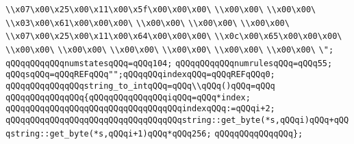 \verb|\\x07\x00\x25\x00\x11\x00\x5f\x00\x00\x00\|\newline
\verb|\\x00\x00\|\newline
\verb|\\x00\x00\|\newline
\verb|\\x03\x00\x61\x00\x00\x00\|\newline
\verb|\\x00\x00\|\newline
\verb|\\x00\x00\|\newline
\verb|\\x00\x00\|\newline
\verb|\\x07\x00\x25\x00\x11\x00\x64\x00\x00\x00\|\newline
\verb|\\x0c\x00\x65\x00\x00\x00\|\newline
\verb|\\x00\x00\|\newline
\verb|\\x00\x00\|\newline
\verb|\\x00\x00\|\newline
\verb|\\x00\x00\|\newline
\verb|\\x00\x00\|\newline
\verb|\\x00\x00\|\newline
\verb|\";|\newline
\verb|qQQqqQQqqQQqnumstatesqQQq=qQQq104;|\newline
\verb|qQQqqQQqqQQqnumrulesqQQq=qQQq55;|\newline
\verb|qQQqsqQQq=qQQqREFqQQq"";qQQqqQQqindexqQQq=qQQqREFqQQq0;|\newline
\verb|qQQqqQQqqQQqqQQqstring_to_intqQQq=qQQq\\qQQq()qQQq=qQQq|\newline
\verb|qQQqqQQqqQQqqQQq{qQQqqQQqqQQqqQQqiqQQq=qQQq*index;|\newline
\verb|qQQqqQQqqQQqqQQqqQQqqQQqqQQqqQQqqQQqindexqQQq:=qQQqi+2;|\newline
\verb|qQQqqQQqqQQqqQQqqQQqqQQqqQQqqQQqqQQqstring::get_byte(*s,qQQqi)qQQq+qQQqstring::get_byte(*s,qQQqi+1)qQQq*qQQq256;|\newline
\verb|qQQqqQQqqQQqqQQq};|\newline
